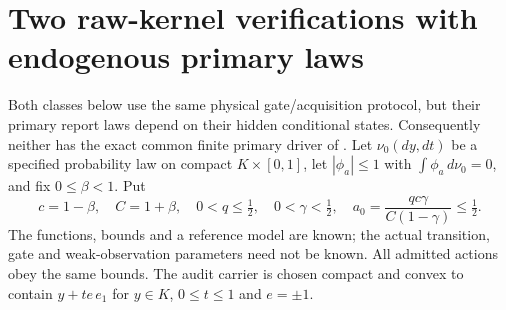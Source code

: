 \section{Two raw-kernel verifications with endogenous primary laws}
\label{sec:realizations}
Both classes below use the same physical gate/acquisition protocol, but their primary report laws depend on their hidden conditional states. Consequently neither has the exact common finite primary driver of \cite{GTF53}. Let $\nu_0(dy,dt)$ be a specified probability law on compact $K\times[0,1]$, let $|\phi_a|\le1$ with $\int\phi_a\,d\nu_0=0$, and fix $0\le\beta<1$. Put
\[
 c=1-\beta,\quad C=1+\beta,\quad
 0<q\le\tfrac12,\quad 0<\gamma<\tfrac12,\quad
 a_0=\frac{qc\gamma}{C(1-\gamma)}\le\tfrac12.
\]
The functions, bounds and a reference model are known; the actual transition, gate and weak-observation parameters need not be known. All admitted actions obey the same bounds. The audit carrier is chosen compact and convex to contain $y+t e\,e_1$ for $y\in K$, $0\le t\le1$ and $e=\pm1$.

